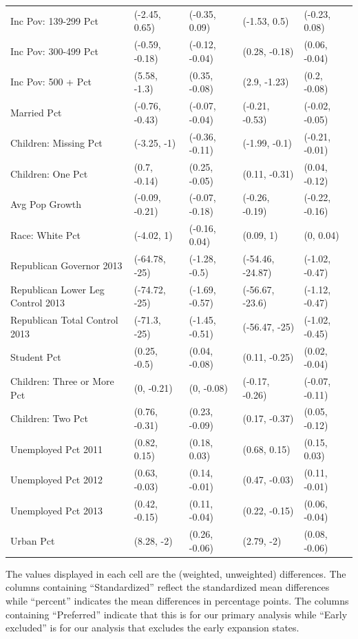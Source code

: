 \begin{landscape}
\begin{table}[h!]
\begin{threeparttable}
\begin{tabular}{lllll}
  Inc Pov: 139-299 Pct & (-2.45, 0.65) & (-0.35, 0.09) & (-1.53, 0.5) & (-0.23, 0.08) \\ 
  Inc Pov: 300-499 Pct & (-0.59, -0.18) & (-0.12, -0.04) & (0.28, -0.18) & (0.06, -0.04) \\ 
  Inc Pov: 500 + Pct & (5.58, -1.3) & (0.35, -0.08) & (2.9, -1.23) & (0.2, -0.08) \\ 
  Married Pct & (-0.76, -0.43) & (-0.07, -0.04) & (-0.21, -0.53) & (-0.02, -0.05) \\ 
  Children: Missing Pct & (-3.25, -1) & (-0.36, -0.11) & (-1.99, -0.1) & (-0.21, -0.01) \\ 
  Children: One Pct & (0.7, -0.14) & (0.25, -0.05) & (0.11, -0.31) & (0.04, -0.12) \\ 
  Avg Pop Growth & (-0.09, -0.21) & (-0.07, -0.18) & (-0.26, -0.19) & (-0.22, -0.16) \\ 
  Race: White Pct & (-4.02, 1) & (-0.16, 0.04) & (0.09, 1) & (0, 0.04) \\ 
  Republican Governor 2013 & (-64.78, -25) & (-1.28, -0.5) & (-54.46, -24.87) & (-1.02, -0.47) \\ 
  Republican Lower Leg Control 2013 & (-74.72, -25) & (-1.69, -0.57) & (-56.67, -23.6) & (-1.12, -0.47) \\ 
  Republican Total Control 2013 & (-71.3, -25) & (-1.45, -0.51) & (-56.47, -25) & (-1.02, -0.45) \\ 
  Student Pct & (0.25, -0.5) & (0.04, -0.08) & (0.11, -0.25) & (0.02, -0.04) \\ 
  Children: Three or More Pct & (0, -0.21) & (0, -0.08) & (-0.17, -0.26) & (-0.07, -0.11) \\ 
  Children: Two Pct & (0.76, -0.31) & (0.23, -0.09) & (0.17, -0.37) & (0.05, -0.12) \\ 
  Unemployed Pct 2011 & (0.82, 0.15) & (0.18, 0.03) & (0.68, 0.15) & (0.15, 0.03) \\ 
  Unemployed Pct 2012 & (0.63, -0.03) & (0.14, -0.01) & (0.47, -0.03) & (0.11, -0.01) \\ 
  Unemployed Pct 2013 & (0.42, -0.15) & (0.11, -0.04) & (0.22, -0.15) & (0.06, -0.04) \\ 
  Urban Pct & (8.28, -2) & (0.26, -0.06) & (2.79, -2) & (0.08, -0.06) \\ 
   \hline
\end{tabular}
    \begin{tablenotes}
      \item[] The values displayed in each cell are the (weighted, unweighted) differences. The columns containing ``Standardized'' reflect the standardized mean differences while ``percent'' indicates the mean differences in percentage points. The columns containing ``Preferred'' indicate that this is for our primary analysis while ``Early excluded'' is for our analysis that excludes the early expansion states.
    \end{tablenotes}
\end{threeparttable}
\end{table}

\end{landscape}

